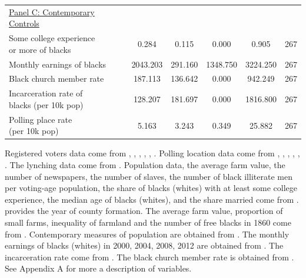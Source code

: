 \documentclass[AEJ, finalmode]{AEA}
\newcommand{\rowgroup}[1]{\hspace{-1em}#1}
\begin{document}
\begin{table}
\begin{tabular}{lccccc}
					\rowgroup{\underline{Panel C: Contemporary Controls}}    &   &    &    &   &  \\
					\makecell[l]{Some college experience\\or more of blacks}&       0.284&       0.115&       0.000&       0.905&         267\\
					Monthly earnings of blacks&    2043.203&     291.160&    1348.750&    3224.250&         267\\
					Black church member rate&     187.113&     136.642&       0.000&     942.249&         267\\
					\makecell[l]{Incarceration rate of\\blacks (per 10k pop)}&     128.207&     181.697&       0.000&    1816.800&         267\\
					\makecell[l]{Polling place rate\\(per 10k pop)}&       5.163&       3.243&       0.349&      25.882&         267\\
				\end{tabular}
				\begin{tablenotes}[Source]	
					Registered voters data come from , , , , , . Polling location data come from , , , , , . The lynching data come from . Population data, the average farm value, the number of newspapers, the number of slaves, the number of black illiterate men per voting-age population, the share of blacks (whites) with at least some college experience, the median age of blacks (whites), and the share married come from .  provides the year of county formation. The average farm value, proportion of small farms, inequality of farmland and the number of free blacks in 1860 come from . Contemporary measures of population are obtained from . The monthly earnings of blacks (whites) in 2000, 2004, 2008, 2012 are obtained from . The incarceration rate come from . The black church member rate is obtained from . See Appendix A for more a description of variables.                                                
				\end{tablenotes}
		\label{statistics}
\end{table}
\end{document}
